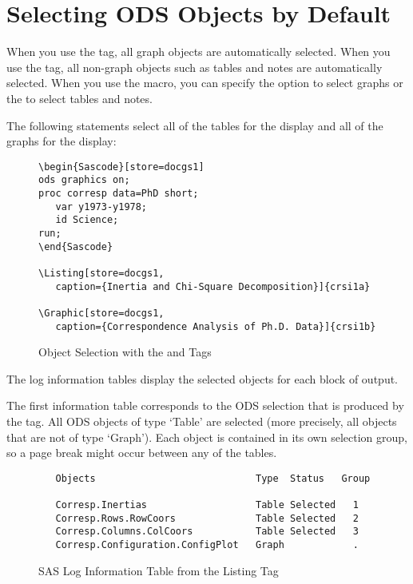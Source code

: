 \documentclass[article,oneside]{memoir}
\begin{document}
\section{Selecting ODS Objects by Default}\label{odsdefault}

  When you use the  tag, all graph objects are automatically selected.
  When you use the  tag, all non-graph objects such as tables and notes
  are automatically selected.  When you use the  macro, you can specify
  the  option to select graphs or the  to
  select tables and notes.

  The following statements select all of the tables for the 
  display and all of the graphs for the  display:

\begin{figure}[H]
\begin{snugshade}
\begin{verbatim}
\begin{Sascode}[store=docgs1]
ods graphics on;
proc corresp data=PhD short;
   var y1973-y1978;
   id Science;
run;
\end{Sascode}

\Listing[store=docgs1,
   caption={Inertia and Chi-Square Decomposition}]{crsi1a}

\Graphic[store=docgs1,
   caption={Correspondence Analysis of Ph.D. Data}]{crsi1b}
\end{verbatim}
\end{snugshade}
\caption{Object Selection with the  and  Tags}\label{optionoption}
\end{figure}

  The log information tables display the selected objects for each
  block of output.

  The first information table corresponds to the ODS selection that is produced
  by the  tag. All ODS objects of type `Table' are
  selected (more precisely, all objects that are not of type `Graph').
  Each object is contained in its own selection group, so
  a page break might occur between any of the tables.

\begin{figure}[H]
\begin{snugshade}
\begin{verbatim}
   Objects                            Type  Status   Group

   Corresp.Inertias                   Table Selected   1
   Corresp.Rows.RowCoors              Table Selected   2
   Corresp.Columns.ColCoors           Table Selected   3
   Corresp.Configuration.ConfigPlot   Graph            .
\end{verbatim}
\end{snugshade}
\caption{SAS Log Information Table from the Listing Tag}\label{loglstinfo}
\end{figure}
\end{document}
